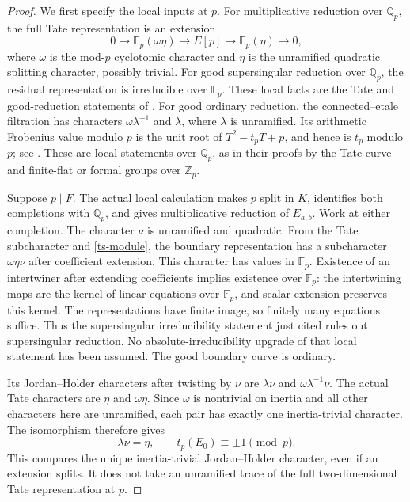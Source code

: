 \begin{proof}
We first specify the local inputs at $p$. For multiplicative reduction
over $\mathbb Q_p$, the full Tate representation is an extension
\[
 0\longrightarrow\mathbb F_p(\omega\eta)
 \longrightarrow E[p]\longrightarrow\mathbb F_p(\eta)
 \longrightarrow0,
\]
where $\omega$ is the mod-$p$ cyclotomic character and $\eta$ is the
unramified quadratic splitting character, possibly trivial.
For good supersingular reduction over $\mathbb Q_p$, the residual
representation is irreducible over $\mathbb F_p$. These local facts
are the Tate and good-reduction statements of
\cite[Propositions~2.12(b) and 2.11(c)]{DarmonDiamondTaylorLocal}.
For good ordinary reduction, the connected--etale filtration has
characters $\omega\lambda^{-1}$ and $\lambda$, where $\lambda$
is unramified. Its arithmetic Frobenius value modulo $p$ is the
unit root of $T^2-t_pT+p$, and hence is $t_p$ modulo $p$;
see \cite[\S1.3.1 and Exercise~1.30]{BoeckleLocalGalois}.
These are local statements over $\mathbb Q_p$, as in their proofs
by the Tate curve and finite-flat or formal groups over $\mathbb Z_p$.

Suppose $p\mid F$. The actual local calculation makes $p$ split in
$K$, identifies both completions with $\mathbb Q_p$, and gives
multiplicative reduction of $E_{a,b}$. Work at either completion.
The character $\nu$ is unramified and quadratic. From the Tate
subcharacter and \eqref{ts-module}, the boundary representation has
a subcharacter $\omega\eta\nu$ after coefficient extension. This
character has values in $\mathbb F_p$. Existence of an intertwiner
after extending coefficients implies existence over $\mathbb F_p$:
the intertwining maps are the kernel of linear equations over
$\mathbb F_p$, and scalar extension preserves this kernel. The
representations have finite image, so finitely many equations suffice.
Thus the supersingular irreducibility statement just cited rules out
supersingular reduction. No absolute-irreducibility upgrade of that
local statement has been assumed. The good boundary curve is ordinary.

Its Jordan--Holder characters after twisting by $\nu$ are
$\lambda\nu$ and $\omega\lambda^{-1}\nu$. The actual Tate
characters are $\eta$ and $\omega\eta$. Since $\omega$ is
nontrivial on inertia and all other characters here are unramified,
each pair has exactly one inertia-trivial character. The isomorphism
therefore gives
\begin{equation}\label{ts-unit-root}
 \lambda\nu=\eta,
 \qquad t_p(E_0)\equiv\pm1\pmod p.
\end{equation}
This compares the unique inertia-trivial Jordan--Holder character,
even if an extension splits. It does not take an unramified trace
of the full two-dimensional Tate representation at $p$.


\end{proof}
